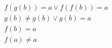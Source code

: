 \begin{align*}
%
& f(g(b)) = a \lor f(f(b)) = a
~\\~
& g(b)  \neq  g(b) \lor g(b) = a
~\\~
& f(b) = a
~\\~
& f(a)  \neq  a
%
\end{align*}
